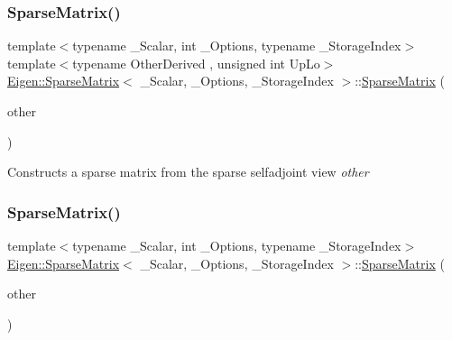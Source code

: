 \subsubsection{\texorpdfstring{SparseMatrix()}{SparseMatrix()}\hspace{0.1cm}{\footnotesize\ttfamily [4/5]}}
{\footnotesize\ttfamily template$<$typename \+\_\+\+Scalar, int \+\_\+\+Options, typename \+\_\+\+Storage\+Index$>$ \\
template$<$typename Other\+Derived , unsigned int Up\+Lo$>$ \\
\mbox{\hyperlink{class_eigen_1_1_sparse_matrix}{Eigen\+::\+Sparse\+Matrix}}$<$ \+\_\+\+Scalar, \+\_\+\+Options, \+\_\+\+Storage\+Index $>$\+::\mbox{\hyperlink{class_eigen_1_1_sparse_matrix}{Sparse\+Matrix}} (\begin{DoxyParamCaption}\item[{const \mbox{\hyperlink{class_eigen_1_1_sparse_self_adjoint_view}{Sparse\+Self\+Adjoint\+View}}$<$ Other\+Derived, Up\+Lo $>$ \&}]{other }\end{DoxyParamCaption})\hspace{0.3cm}{\ttfamily [inline]}}

Constructs a sparse matrix from the sparse selfadjoint view {\itshape other} \mbox{\label{class_eigen_1_1_sparse_matrix_af0fa64cdba1f30353aac937a31db33f3}} 
\subsubsection{\texorpdfstring{SparseMatrix()}{SparseMatrix()}\hspace{0.1cm}{\footnotesize\ttfamily [5/5]}}
{\footnotesize\ttfamily template$<$typename \+\_\+\+Scalar, int \+\_\+\+Options, typename \+\_\+\+Storage\+Index$>$ \\
\mbox{\hyperlink{class_eigen_1_1_sparse_matrix}{Eigen\+::\+Sparse\+Matrix}}$<$ \+\_\+\+Scalar, \+\_\+\+Options, \+\_\+\+Storage\+Index $>$\+::\mbox{\hyperlink{class_eigen_1_1_sparse_matrix}{Sparse\+Matrix}} (\begin{DoxyParamCaption}\item[{const \mbox{\hyperlink{class_eigen_1_1_sparse_matrix}{Sparse\+Matrix}}$<$ \+\_\+\+Scalar, \+\_\+\+Options, \+\_\+\+Storage\+Index $>$ \&}]{other }\end{DoxyParamCaption})\hspace{0.3cm}{\ttfamily [inline]}}

